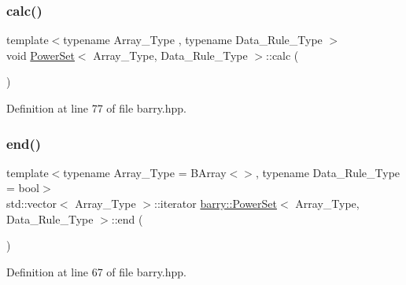 \mbox{\label{classbarry_1_1_power_set_ad3b707294498105b2cc1a04017cc96d2}} 
\subsubsection{\texorpdfstring{calc()}{calc()}}
{\footnotesize\ttfamily template$<$typename Array\+\_\+\+Type , typename Data\+\_\+\+Rule\+\_\+\+Type $>$ \\
void \hyperlink{classbarry_1_1_power_set}{Power\+Set}$<$ Array\+\_\+\+Type, Data\+\_\+\+Rule\+\_\+\+Type $>$\+::calc (\begin{DoxyParamCaption}{ }\end{DoxyParamCaption})\hspace{0.3cm}{\ttfamily [inline]}}



Definition at line 77 of file barry.\+hpp.

\mbox{\label{classbarry_1_1_power_set_a1fb01ffc52e39a831058c480e981da9e}} 
\subsubsection{\texorpdfstring{end()}{end()}}
{\footnotesize\ttfamily template$<$typename Array\+\_\+\+Type  = B\+Array$<$$>$, typename Data\+\_\+\+Rule\+\_\+\+Type  = bool$>$ \\
std\+::vector$<$ Array\+\_\+\+Type $>$\+::iterator \hyperlink{classbarry_1_1_power_set}{barry\+::\+Power\+Set}$<$ Array\+\_\+\+Type, Data\+\_\+\+Rule\+\_\+\+Type $>$\+::end (\begin{DoxyParamCaption}{ }\end{DoxyParamCaption})\hspace{0.3cm}{\ttfamily [inline]}}



Definition at line 67 of file barry.\+hpp.

\mbox{\label{classbarry_1_1_power_set_a53ca37c9cb14abd6f61bc0127ac9d067}} 
